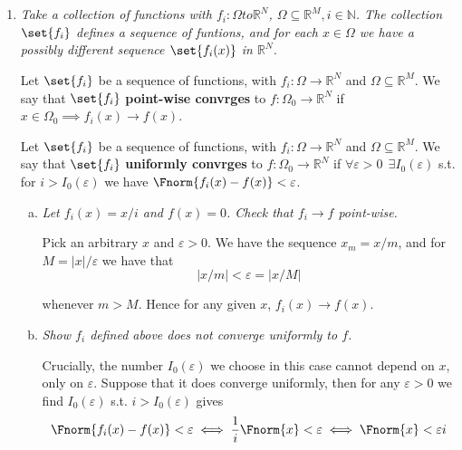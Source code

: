 \documentclass{article}
\begin{document}
\displayoptions

\section{}

\begin{enumerate}[1.]
  \item {\itshape
    Take a collection of functions with $f_i: \Omega to \mathbb{R}^N$, $\Omega \subseteq \mathbb{R}^M, i \in \mathbb{N}$. The collection $\set{f_i}$ defines a sequence of funtions, and for each $x \in \Omega$ we have a possibly different sequence $\set{f_i(x)}$ in $\mathbb{R}^N$.

    Let $\set{f_i}$ be a sequence of functions, with $f_i: \Omega \to \mathbb{R}^N$ and $\Omega \subseteq \mathbb{R}^M$. We say that $\set{f_i}$ \textbf{point-wise convrges} to $f: \Omega_0 \to \mathbb{R}^N$ if $x \in \Omega_0 \implies f_i(x) \to f(x)$.

    Let $\set{f_i}$ be a sequence of functions, with $f_i: \Omega \to \mathbb{R}^N$ and $\Omega \subseteq \mathbb{R}^M$. We say that $\set{f_i}$ \textbf{uniformly convrges} to $f: \Omega_0 \to \mathbb{R}^N$ if $\forall \varepsilon > 0 ~~ \exists I_0(\varepsilon)$ s.t. for $i > I_0(\varepsilon)$ we have $\Fnorm{f_i(x) - f(x)} < \varepsilon$. }

    \begin{enumerate}[a)]
      \item \textit{Let $f_i(x) = x / i$ and $f(x) = 0$. Check that $f_i \to f$ point-wise.}

        \solution Pick an arbitrary $x$ and $\varepsilon > 0$. We have the sequence $x_m = x / m$, and for $M = |x| / \varepsilon$ we have that
        \[
          |x / m| < \varepsilon = |x / M|
        \]

        whenever $m > M$. Hence for any given $x$, $f_i(x) \to f(x)$.

      \item \textit{Show $f_i$ defined above does not converge uniformly to $f$.}

        \solution Crucially, the number $I_0(\varepsilon)$ we choose in this case cannot depend on $x$, only on $\varepsilon$. Suppose that it does converge uniformly, then for any $\varepsilon > 0$ we find $I_0(\varepsilon)$ s.t. $i > I_0(\varepsilon)$ gives
        \[
          \Fnorm{f_i(x) - f(x)} < \varepsilon
          \iff
          \dfrac{1}{i} \Fnorm{x} < \varepsilon
          \iff
          \Fnorm{x} < \varepsilon i
        \]


\end{enumerate}
\end{enumerate}
\end{document}

